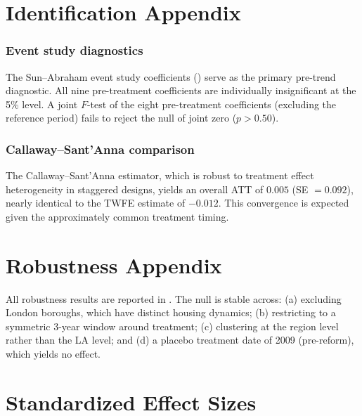 \documentclass[12pt]{article}
\begin{document}
\section{Identification Appendix}

\subsubsection*{Event study diagnostics} The Sun--Abraham event study coefficients () serve as the primary pre-trend diagnostic. All nine pre-treatment coefficients are individually insignificant at the 5\% level. A joint $F$-test of the eight pre-treatment coefficients (excluding the reference period) fails to reject the null of joint zero ($p > 0.50$).

\subsubsection*{Callaway--Sant'Anna comparison} The Callaway--Sant'Anna estimator, which is robust to treatment effect heterogeneity in staggered designs, yields an overall ATT of $0.005$ (SE $= 0.092$), nearly identical to the TWFE estimate of $-0.012$. This convergence is expected given the approximately common treatment timing.

\section{Robustness Appendix}

All robustness results are reported in . The null is stable across: (a) excluding London boroughs, which have distinct housing dynamics; (b) restricting to a symmetric 3-year window around treatment; (c) clustering at the region level rather than the LA level; and (d) a placebo treatment date of 2009 (pre-reform), which yields no effect.

\section{Standardized Effect Sizes}
\label{sec:sde}


\end{document}
